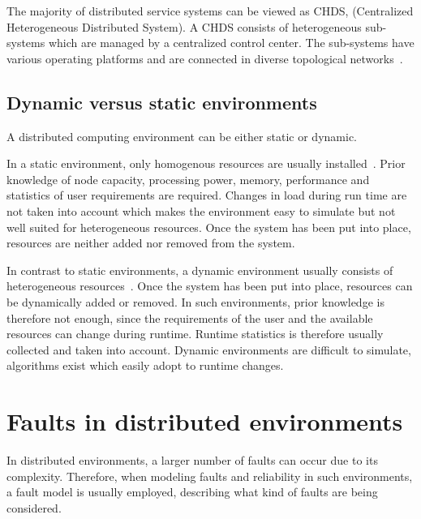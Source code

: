 \documentclass{cslthse-msc}
\begin{document}
The majority of distributed service systems can be viewed as CHDS, (Centralized Heterogeneous Distributed System). A CHDS consists of heterogeneous sub-systems which are managed by a centralized control center. The sub-systems have various operating platforms and are connected in diverse topological networks~\cite{studyServiceRel}.


\subsection{Dynamic versus static environments} \label{subsec:background_dyn_stat_env}
A distributed computing environment can be either static or dynamic.

In a static environment, only homogenous resources are usually installed~\cite{compStudyLoadAndCloud}. Prior knowledge of node capacity, processing power, memory, performance and statistics of user requirements are required. Changes in load during run time are not taken into account which makes the environment easy to simulate but not well suited for heterogeneous resources. Once the system has been put into place, resources are neither added nor removed from the system.

In contrast to static environments, a dynamic environment usually consists of heterogeneous resources~\cite{compStudyLoadAndCloud}. Once the system has been put into place, resources can be dynamically added or removed. In such environments, prior knowledge is therefore not enough, since the requirements of the user and the available resources can change during runtime. Runtime statistics is therefore usually collected and taken into account. Dynamic environments are difficult to simulate, algorithms exist which easily adopt to runtime changes. 


\section{Faults in distributed environments} \label{sec:background_faults_distr_env}
In distributed environments, a larger number of faults can occur due to its complexity. Therefore, when modeling faults and reliability in such environments, a fault model is usually employed, describing what kind of faults are being considered.
\end{document}
